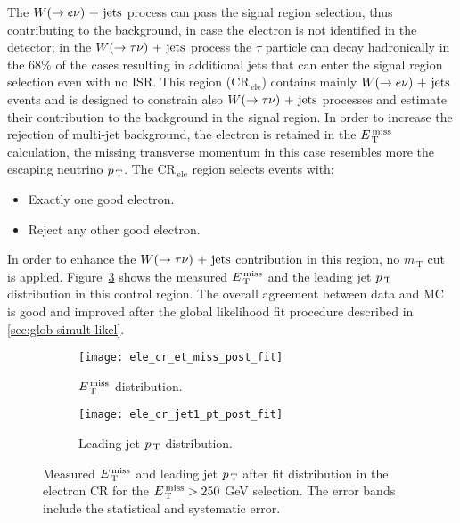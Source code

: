 The $W (\rightarrow e \nu)\mathrm{~+~jets}$ process can pass the signal region selection, thus
contributing to the background, in case the electron is not identified in the
detector; in the $W (\rightarrow \tau \nu)\mathrm{~+~jets}$ process the $\tau$ particle can decay
hadronically in the 68\% of the cases resulting in additional jets that can
enter the signal region selection even with no ISR\@. This region
(CR$_\mathrm{\, ele}$) contains mainly $W (\rightarrow e \nu)\mathrm{~+~jets}$ events and is designed to
constrain also $W (\rightarrow \tau \nu)\mathrm{~+~jets}$ processes and estimate their contribution to
the background in the signal region. In order to increase the rejection of
multi-jet background, the electron is retained in the $E_\mathrm{\, T}^\mathrm{\, miss}$ calculation, the
missing transverse momentum in this case resembles more the escaping neutrino
$p_\mathrm{\, T}$. The CR$_\mathrm{\, ele}$ region selects events with:
\begin{itemize}
\item Exactly one good electron.
\item Reject any other good electron.
\end{itemize}
In order to enhance the $W (\rightarrow \tau \nu)\mathrm{~+~jets}$ contribution in this region, no
$m_\mathrm{\, T}$ cut is applied. Figure~\ref{fig:ele_cr_plots} shows the
measured $E_\mathrm{\, T}^\mathrm{\, miss}$ and the leading jet $p_\mathrm{\, T}$ distribution in this control
region. The overall agreement between data and MC is good and improved after the
global likelihood fit procedure described in \cref{sec:glob-simult-likel}.

\begin{figure}[!h]
  \centering
  \begin{subfigure}[t]{.48\linewidth}
    \texttt{[image: ele\_cr\_et\_miss\_post\_fit]}
    \caption{$E_\mathrm{\, T}^\mathrm{\, miss}$ distribution.}
    \label{fig:ele_cr_et_miss_pre_fit}
  \end{subfigure}
  \begin{subfigure}[t]{.48\linewidth}
    \texttt{[image: ele\_cr\_jet1\_pt\_post\_fit]}
    \caption{Leading jet $p_\mathrm{\, T}$ distribution.}
    \label{fig:ele_cr_jet1_pt_pre_fit}
  \end{subfigure}
  \caption{Measured $E_\mathrm{\, T}^\mathrm{\, miss}$ and leading jet $p_\mathrm{\, T}$ after fit distribution in the
    electron CR for the $E_\mathrm{\, T}^\mathrm{\, miss} > 250~$GeV selection. The error bands include the
    statistical and systematic error.}
  \label{fig:ele_cr_plots}
\end{figure}
